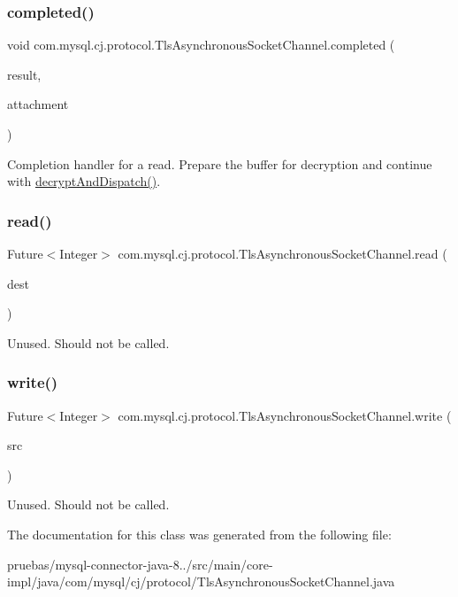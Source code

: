 \subsubsection{\texorpdfstring{completed()}{completed()}}
{\footnotesize\ttfamily void com.\+mysql.\+cj.\+protocol.\+Tls\+Asynchronous\+Socket\+Channel.\+completed (\begin{DoxyParamCaption}\item[{Integer}]{result,  }\item[{Void}]{attachment }\end{DoxyParamCaption})}

Completion handler for a read. Prepare the buffer for decryption and continue with \mbox{\hyperlink{}{decrypt\+And\+Dispatch()}}. \mbox{\label{classcom_1_1mysql_1_1cj_1_1protocol_1_1_tls_asynchronous_socket_channel_a6b74d70823bd434de26eb434a1637b73}} 
\subsubsection{\texorpdfstring{read()}{read()}}
{\footnotesize\ttfamily Future$<$Integer$>$ com.\+mysql.\+cj.\+protocol.\+Tls\+Asynchronous\+Socket\+Channel.\+read (\begin{DoxyParamCaption}\item[{Byte\+Buffer}]{dest }\end{DoxyParamCaption})}

Unused. Should not be called. \mbox{\label{classcom_1_1mysql_1_1cj_1_1protocol_1_1_tls_asynchronous_socket_channel_a993f4bc3833dc8db73f3163954faca33}} 
\subsubsection{\texorpdfstring{write()}{write()}}
{\footnotesize\ttfamily Future$<$Integer$>$ com.\+mysql.\+cj.\+protocol.\+Tls\+Asynchronous\+Socket\+Channel.\+write (\begin{DoxyParamCaption}\item[{Byte\+Buffer}]{src }\end{DoxyParamCaption})}

Unused. Should not be called. 

The documentation for this class was generated from the following file\+:\begin{DoxyCompactItemize}
\item 
pruebas/mysql-\/connector-\/java-\/8../src/main/core-\/impl/java/com/mysql/cj/protocol/Tls\+Asynchronous\+Socket\+Channel.\+java\end{DoxyCompactItemize}
